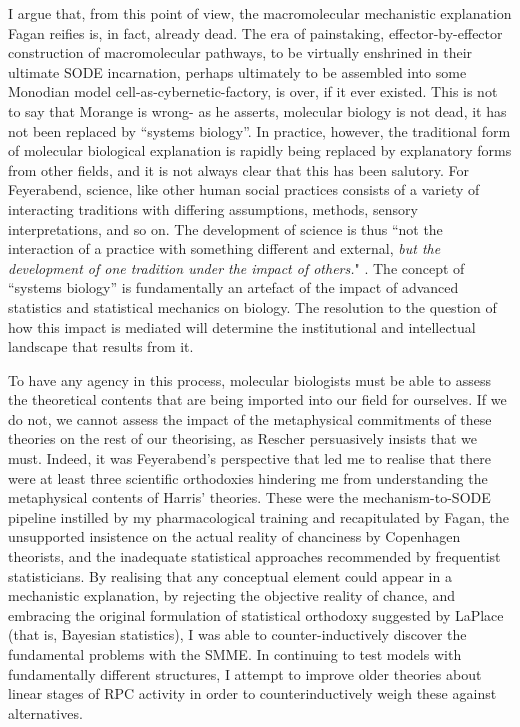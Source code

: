 \documentclass{ut-thesis}
\begin{document}
\begin{NoHyper}
I argue that, from this point of view, the macromolecular mechanistic explanation Fagan reifies is, in fact, already dead. The era of painstaking, effector-by-effector construction of macromolecular pathways, to be virtually enshrined in their ultimate SODE incarnation, perhaps ultimately to be assembled into some Monodian model cell-as-cybernetic-factory, is over, if it ever existed. This is not to say that Morange is wrong- as he asserts, molecular biology is not dead, it has not been replaced by ``systems biology''. In practice, however, the traditional form of molecular biological explanation is rapidly being replaced by explanatory forms from other fields, and it is not always clear that this has been salutory. For Feyerabend, science, like other human social practices consists of a variety of interacting traditions with differing assumptions, methods, sensory interpretations, and so on. The development of science is thus ``not the interaction of a practice with something different and external, \textit{but the development of one tradition under the impact of others.}" \cite[p.232]{Feyerabend1993}. The concept of ``systems biology'' is fundamentally an artefact of the impact of advanced statistics and statistical mechanics on biology. The resolution to the question of how this impact is mediated will determine the institutional and intellectual landscape that results from it. 

To have any agency in this process, molecular biologists must be able to assess the theoretical contents that are being imported into our field for ourselves. If we do not, we cannot assess the impact of the metaphysical commitments of these theories on the rest of our theorising, as Rescher persuasively insists that we must. Indeed, it was Feyerabend's perspective that led me to realise that there were at least three scientific orthodoxies hindering me from understanding the metaphysical contents of Harris' theories. These were the mechanism-to-SODE pipeline instilled by my pharmacological training and recapitulated by Fagan, the unsupported insistence on the actual reality of chanciness by Copenhagen theorists, and the inadequate statistical approaches recommended by frequentist statisticians. By realising that any conceptual element could appear in a mechanistic explanation, by rejecting the objective reality of chance, and embracing the original formulation of statistical orthodoxy suggested by LaPlace (that is, Bayesian statistics), I was able to counter-inductively discover the fundamental problems with the SMME. In continuing to test models with fundamentally different structures, I attempt to improve older theories about linear stages of RPC activity in order to counterinductively weigh these against alternatives.


\end{NoHyper}
\end{document}
